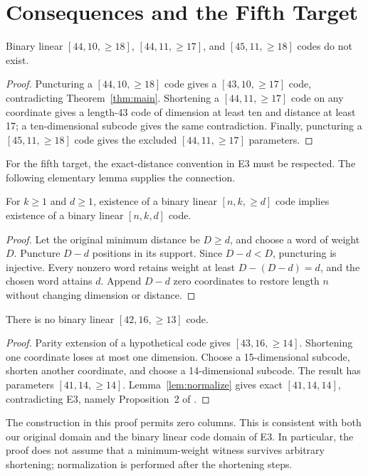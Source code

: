 \section{Consequences and the Fifth Target}
\label{sec:consequences}
\begin{corollary}\label{cor:three}
Binary linear $[44,10,\ge18]$, $[44,11,\ge17]$, and $[45,11,\ge18]$ codes do not exist.
\end{corollary}
\begin{proof}
Puncturing a $[44,10,\ge18]$ code gives a $[43,10,\ge17]$ code, contradicting Theorem~\ref{thm:main}. Shortening a $[44,11,\ge17]$ code on any coordinate gives a length-43 code of dimension at least ten and distance at least 17; a ten-dimensional subcode gives the same contradiction. Finally, puncturing a $[45,11,\ge18]$ code gives the excluded $[44,11,\ge17]$ parameters.
\end{proof}

For the fifth target, the exact-distance convention in E3 must be respected. The following elementary lemma supplies the connection.
\begin{lemma}\label{lem:normalize}
For $k\ge1$ and $d\ge1$, existence of a binary linear $[n,k,\ge d]$ code implies existence of a binary linear $[n,k,d]$ code.
\end{lemma}
\begin{proof}
Let the original minimum distance be $D\ge d$, and choose a word of weight $D$. Puncture $D-d$ positions in its support. Since $D-d<D$, puncturing is injective. Every nonzero word retains weight at least $D-(D-d)=d$, and the chosen word attains $d$. Append $D-d$ zero coordinates to restore length $n$ without changing dimension or distance.
\end{proof}

\begin{theorem}\label{thm:42}
There is no binary linear $[42,16,\ge13]$ code.
\end{theorem}
\begin{proof}
Parity extension of a hypothetical code gives $[43,16,\ge14]$. Shortening one coordinate loses at most one dimension. Choose a 15-dimensional subcode, shorten another coordinate, and choose a 14-dimensional subcode. The result has parameters $[41,14,\ge14]$. Lemma~\ref{lem:normalize} gives exact $[41,14,14]$, contradicting E3, namely Proposition~2 of \citet{bouyuklieva2020}.
\end{proof}
The construction in this proof permits zero columns. This is consistent with both our original domain and the binary linear code domain of E3. In particular, the proof does not assume that a minimum-weight witness survives arbitrary shortening; normalization is performed after the shortening steps.

